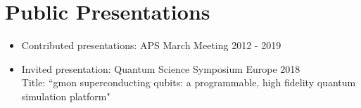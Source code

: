 \documentclass[letterpaper,11pt]{article}
\newcommand{\resumeItem}[2]{
\item \small{#1{#2 \vspace{-2pt} }
}
}
\newcommand{\resumeSubItem}[2]{\vspace{-4pt}\resumeItem{#1}{#2}}
\newcommand{\resumeSubHeadingListStart}{\begin{itemize}[leftmargin=*]}
\newcommand{\resumeSubHeadingListEnd}{\end{itemize}}
\begin{document}
\section{Public Presentations}
\vspace{5pt}
\resumeSubHeadingListStart
\resumeSubItem{Contributed presentations:  APS March Meeting 2012 - 2019}{}
\resumeSubItem{Invited presentation:  Quantum Science Symposium Europe 2018 \\}
{Title:  ``gmon superconducting qubits: a programmable, high fidelity quantum simulation platform"}
\resumeSubHeadingListEnd

\begin{comment}
\section{Technical Skills}
\resumeSubHeadingListStart
\item{
\textbf{Scientific programming}{:  python, numpy, scipy, pandas, matplotlib, git \\
- data acquisition, analysis, and presentation. \\
- Numerical simulations of quantum dynamics}}

\item{\textbf{Electronic test and measurement} }
\item{\textbf{Materials science and device fabrication}, Reactive UHV sputter deposition, Inductively coupled plasma etching, optical lithography}
\item{\textbf{Cryogenics}: Adiabatic demagnetization refridgerator, Dilution refridgerator}
\resumeSubHeadingListEnd
\end{comment}
\end{document}
